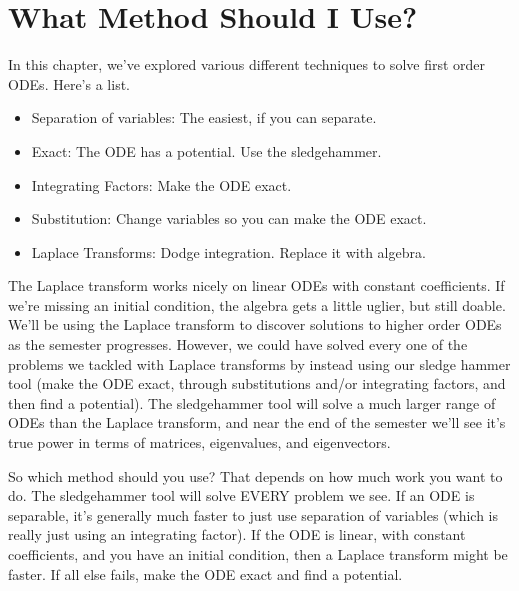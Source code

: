 \section{What Method Should I Use?}
In this chapter, we've explored various different techniques to solve first order ODEs. Here's a list.
\begin{itemize}
 \item Separation of variables: The easiest, if you can separate.
 \item Exact: The ODE has a potential. Use the sledgehammer.
 \item Integrating Factors: Make the ODE exact.
 \item Substitution: Change variables so you can make the ODE exact.
 \item Laplace Transforms: Dodge integration. Replace it with algebra.
\end{itemize}
The Laplace transform works nicely on linear ODEs with constant coefficients. If we're missing an initial condition, the algebra gets a little uglier, but still doable. We'll be using the Laplace transform to discover solutions to higher order ODEs as the semester progresses. However, we could have solved every one of the problems we tackled with Laplace transforms by instead using our sledge hammer tool (make the ODE exact, through substitutions and/or integrating factors, and then find a potential). 
The sledgehammer tool will solve a much larger range of ODEs than the Laplace transform, and near the end of the semester we'll see it's true power in terms of matrices, eigenvalues, and eigenvectors. 

So which method should you use? That depends on how much work you want to do.  The sledgehammer tool will solve EVERY problem we see. If an ODE is separable, it's generally much faster to just use separation of variables (which is really just using an integrating factor).  If the ODE is linear, with constant coefficients, and you have an initial condition, then a Laplace transform might be faster.  If all else fails, make the ODE exact and find a potential.

